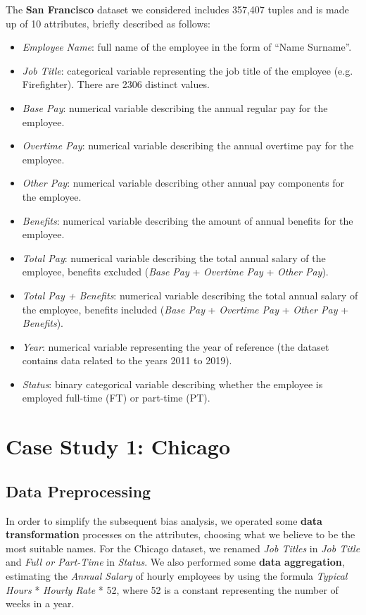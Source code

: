 The \textbf{San Francisco} dataset we considered includes 357,407 tuples and is made up of 10 attributes, briefly described as follows:
\begin{itemize}
\item \textit{Employee Name}: full name of the employee in the form of ``Name Surname''.
\item \textit{Job Title}: categorical variable representing the job title of the employee (e.g. Firefighter). There are 2306 distinct values.
\item \textit{Base Pay}: numerical variable describing the annual regular pay for the employee.
\item \textit{Overtime Pay}: numerical variable describing the annual overtime pay for the employee.
\item \textit{Other Pay}: numerical variable describing other annual pay components for the employee.
\item \textit{Benefits}: numerical variable describing the amount of annual benefits for the employee.
\item \textit{Total Pay}: numerical variable describing the total annual salary of the employee, benefits excluded (\textit{Base Pay} + \textit{Overtime Pay} + \textit{Other Pay}).
\item \textit{Total Pay + Benefits}: numerical variable describing the total annual salary of the employee, benefits included (\textit{Base Pay} + \textit{Overtime Pay} + \textit{Other Pay} + \textit{Benefits}).
\item \textit{Year}: numerical variable representing the year of reference (the dataset contains data related to the years 2011 to 2019).
\item \textit{Status}: binary categorical variable describing whether the employee is employed full-time (FT) or part-time (PT).
\end{itemize}


\section{Case Study 1: Chicago}
\subsection{Data Preprocessing}
In order to simplify the subsequent bias analysis, we operated some \textbf{data transformation} processes on the attributes, choosing what we believe to be the most suitable names. For the Chicago dataset, we renamed \textit{Job Titles} in \textit{Job Title} and \textit{Full or Part-Time} in \textit{Status}. We also performed some \textbf{data aggregation}, estimating the \textit{Annual Salary} of hourly employees by using the formula \textit{Typical Hours} * \textit{Hourly Rate} * 52, where 52 is a constant representing the number of weeks in a year.


